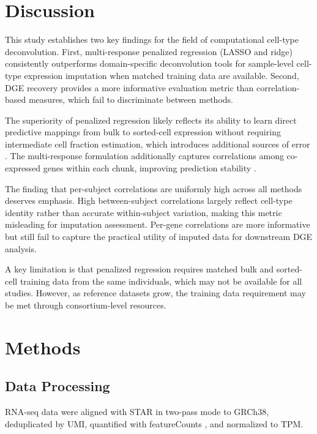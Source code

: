 \documentclass[11pt]{article}
\begin{document}
\section{Discussion}

This study establishes two key findings for the field of computational cell-type deconvolution. First, multi-response penalized regression (LASSO and ridge) consistently outperforms domain-specific deconvolution tools for sample-level cell-type expression imputation when matched training data are available. Second, DGE recovery provides a more informative evaluation metric than correlation-based measures, which fail to discriminate between methods.

The superiority of penalized regression likely reflects its ability to learn direct predictive mappings from bulk to sorted-cell expression without requiring intermediate cell fraction estimation, which introduces additional sources of error \citep{avila2018evaluation}. The multi-response formulation additionally captures correlations among co-expressed genes within each chunk, improving prediction stability \citep{friedman2010regularization}.

The finding that per-subject correlations are uniformly high across all methods deserves emphasis. High between-subject correlations largely reflect cell-type identity rather than accurate within-subject variation, making this metric misleading for imputation assessment. Per-gene correlations are more informative but still fail to capture the practical utility of imputed data for downstream DGE analysis.

A key limitation is that penalized regression requires matched bulk and sorted-cell training data from the same individuals, which may not be available for all studies. However, as reference datasets grow, the training data requirement may be met through consortium-level resources.

\section{Methods}

\subsection{Data Processing}
RNA-seq data were aligned with STAR \citep{dobin2013star} in two-pass mode to GRCh38, deduplicated by UMI, quantified with featureCounts \citep{liao2014featurecounts}, and normalized to TPM.
\end{document}
